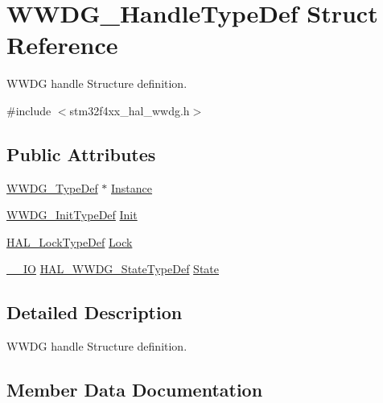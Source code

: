 \hypertarget{struct_w_w_d_g___handle_type_def}{}\section{W\+W\+D\+G\+\_\+\+Handle\+Type\+Def Struct Reference}
\label{struct_w_w_d_g___handle_type_def}


W\+W\+DG handle Structure definition.  




{\ttfamily \#include $<$stm32f4xx\+\_\+hal\+\_\+wwdg.\+h$>$}

\subsection*{Public Attributes}
\begin{DoxyCompactItemize}
\item 
\hyperlink{struct_w_w_d_g___type_def}{W\+W\+D\+G\+\_\+\+Type\+Def} $\ast$ \hyperlink{struct_w_w_d_g___handle_type_def_af40eb4f45fcac91d6100bbd3c753813d}{Instance}
\item 
\hyperlink{struct_w_w_d_g___init_type_def}{W\+W\+D\+G\+\_\+\+Init\+Type\+Def} \hyperlink{struct_w_w_d_g___handle_type_def_ae8ce42374ba68e31fae2499fe05a3dc9}{Init}
\item 
\hyperlink{stm32f4xx__hal__def_8h_ab367482e943333a1299294eadaad284b}{H\+A\+L\+\_\+\+Lock\+Type\+Def} \hyperlink{struct_w_w_d_g___handle_type_def_ab5a66448d9ddd25c3bc3789e2504b164}{Lock}
\item 
\hyperlink{core__sc300_8h_aec43007d9998a0a0e01faede4133d6be}{\+\_\+\+\_\+\+IO} \hyperlink{group___w_w_d_g___exported___types_ga0dbbade5e745711745e5f9cc10991301}{H\+A\+L\+\_\+\+W\+W\+D\+G\+\_\+\+State\+Type\+Def} \hyperlink{struct_w_w_d_g___handle_type_def_a6c82baebf81039060c7064ec6aad1b91}{State}
\end{DoxyCompactItemize}


\subsection{Detailed Description}
W\+W\+DG handle Structure definition. 

\subsection{Member Data Documentation}
